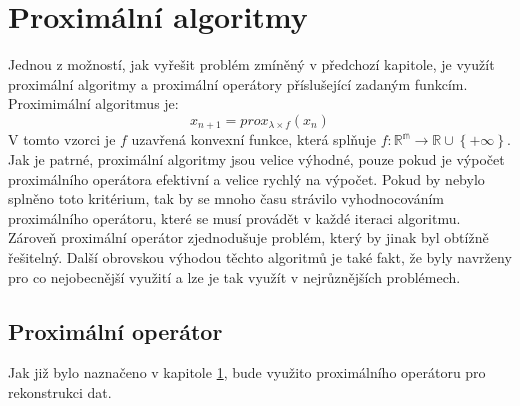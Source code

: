 \documentclass[FM,BP]{tulthesis}
\newcounter{Vzorce}
\begin{document}
\chapter{Proximální algoritmy}
\label{ch:proxalg}
Jednou z možností, jak vyřešit problém zmíněný v předchozí kapitole, je využít proximální algoritmy a proximální operátory příslušející zadaným funkcím. Proximimální algoritmus je:
\begin{equation} \label{eq:proxAlg} \tag{Vzorec \theVzorce}
x_{n+1} = prox_{\lambda \times f}(x_{n})
\end{equation}
V tomto vzorci je $f$ uzavřená konvexní funkce, která splňuje $f : \mathbb{R^{m}} \rightarrow \mathbb{R} \cup \left\{+\infty\right\}$. Jak je patrné, proximální algoritmy jsou velice výhodné, pouze pokud je výpočet proximálního operátora efektivní a velice rychlý na výpočet. Pokud by nebylo splněno toto kritérium, tak by se mnoho času strávilo vyhodnocováním proximálního operátoru, které se musí provádět v každé iteraci algoritmu. Zároveň proximální operátor zjednodušuje problém, který by jinak byl obtížně řešitelný. Další obrovskou výhodou těchto algoritmů je také fakt, že byly navrženy pro co nejobecnější využití a lze je tak využít v nejrůznějších problémech.

\section{Proximální operátor}
Jak již bylo naznačeno v kapitole \ref{ch:proxalg}, bude využito proximálního operátoru pro rekonstrukci dat. 
\end{document}
